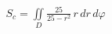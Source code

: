 \documentclass[preview]{standalone}
\begin{document}
\begin{align*}
S_c = \iint\limits_D \frac{25}{25 - r^2} \, r \, dr \, d\varphi
\end{align*}
\end{document}
